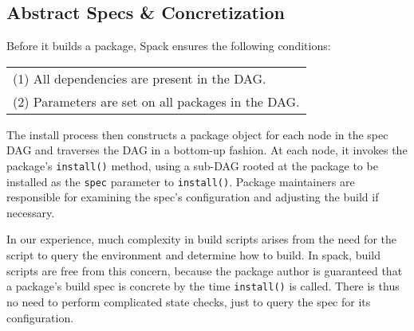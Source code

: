 
\subsection{Abstract Specs \& Concretization}
	

Before it builds a package, Spack ensures the following conditions:
\newline

\begin{tabular}{l}
(1) All dependencies are present in the DAG. \\
(2) Parameters are set on all packages in the DAG. \\
\end{tabular}\newline

\noindent
The install process then constructs a package object for each node in the spec DAG
and traverses the DAG in a bottom-up fashion.  At each node, it invokes the package's
{\tt install()} method, using a sub-DAG rooted at the package to be installed as the {\tt spec}
parameter to {\tt install()}. Package maintainers are responsible for examining the spec's
configuration and adjusting the build if necessary.


In our experience, much complexity in build scripts arises from the need for the script to
query the environment and determine how to build.  In spack, build scripts are free from this 
concern, because the package author is guaranteed that a package's build spec is concrete
by the time {\tt install()} is called. There is thus no need to perform complicated state checks,
just to query the spec for its configuration.


